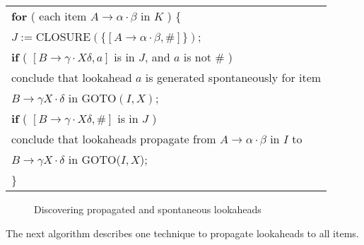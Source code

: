 \documentclass[12pt,a4paper,twoside,openany]{book}
\begin{document}
\begin{center}
    \begin{tabular}{l}
        \textbf{for} ( each item $A\rightarrow\alpha\cdot\beta$ in $K$ ) \{\\
        \qquad $J:=\text{CLOSURE}(\{[A\rightarrow\alpha\cdot\beta,\#]\})$;\\
        \qquad\textbf{if} ( $[B\rightarrow\gamma\cdot X\delta,a]$ is in $J$, and $a$ is not \# )\\
        \qquad\qquad conclude that lookahead $a$ is generated spontaneously for item\\
        \qquad\qquad\qquad $B\rightarrow\gamma X\cdot\delta$ in $\text{GOTO}(I,X)$;\\
        \qquad\textbf{if} ( $[B\rightarrow\gamma\cdot X\delta,\#]$ is in $J$ )\\
        \qquad\qquad conclude that lookaheads propagate from $A\rightarrow\alpha\cdot\beta$ in $I$ to\\
        \qquad\qquad\qquad $B\rightarrow\gamma X\cdot\delta$ in GOTO($I,X$);\\
        \}
    \end{tabular}
\end{center}
\begin{figure}[htbp]
    \caption{Discovering propagated and spontaneous lookaheads}
    \label{Figure:4.45}
\end{figure}

The next algorithm describes one technique to propagate lookaheads to all items.
\end{document}
